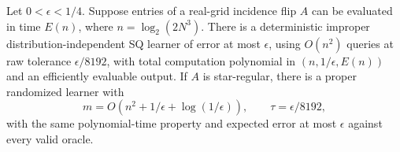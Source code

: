 \begin{theorem}\label{thm:fast}
Let $0<\epsilon<1/4$. Suppose entries of a real-grid incidence flip $A$ can be evaluated in time $E(n)$, where $n=\log_2(2N^3)$. There is a deterministic improper distribution-independent SQ learner of error at most $\epsilon$, using $O(n^2)$ queries at raw tolerance $\epsilon/8192$, with total computation polynomial in $(n,1/\epsilon,E(n))$ and an efficiently evaluable output. If $A$ is star-regular, there is a proper randomized learner with
\[
 m=O(n^2+1/\epsilon+\log(1/\epsilon)),\qquad
 \tau=\epsilon/8192,
\]
with the same polynomial-time property and expected error at most $\epsilon$ against every valid oracle.
\end{theorem}

